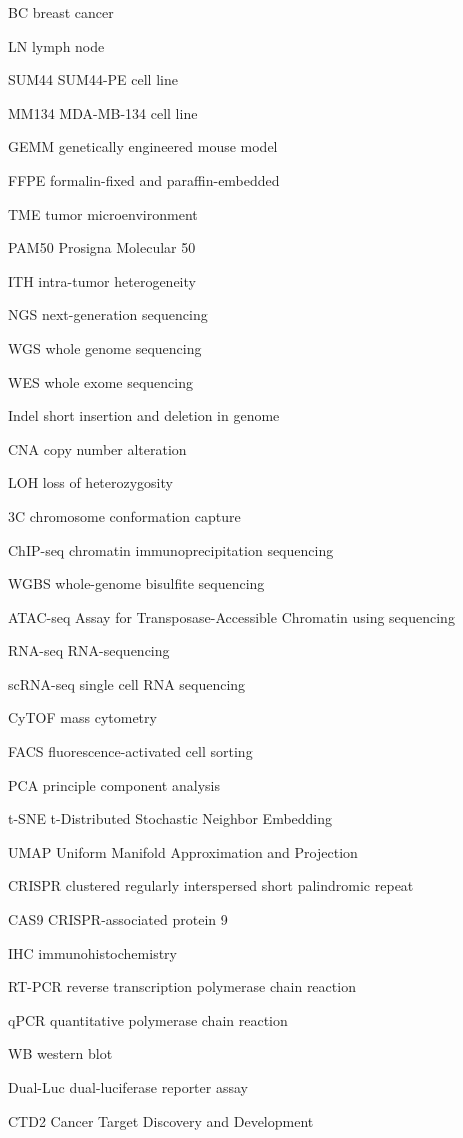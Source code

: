 
\begin{denotation}[3cm]
  \item[BC]	breast cancer 
  \item[LN]	lymph node
  \item[SUM44]	SUM44-PE cell line
  \item[MM134]	MDA-MB-134 cell line
  \item[GEMM]	genetically engineered mouse model
  \item[FFPE]	formalin-fixed and paraffin-embedded
  \item[TME]	tumor microenvironment
  \item[PAM50]	Prosigna Molecular 50
  \item[ITH]	intra-tumor heterogeneity
  \item[NGS]	next-generation sequencing
  \item[WGS]	whole genome sequencing
  \item[WES]	whole exome sequencing
  \item[Indel]	short insertion and deletion in genome
  \item[CNA]	copy number alteration
  \item[LOH]	loss of heterozygosity
  \item[3C]	chromosome conformation capture
  \item[ChIP-seq]	chromatin immunoprecipitation sequencing
  \item[WGBS]	whole-genome bisulfite sequencing
  \item[ATAC-seq]	Assay for Transposase-Accessible Chromatin using sequencing
  \item[RNA-seq]	RNA-sequencing
  \item[scRNA-seq]	single cell RNA sequencing
  \item[CyTOF]	mass cytometry
  \item[FACS]	fluorescence-activated cell sorting 
  \item[PCA]	principle component analysis
  \item[t-SNE]	t-Distributed Stochastic Neighbor Embedding
  \item[UMAP]	Uniform Manifold Approximation and Projection
  \item[CRISPR]	clustered regularly interspersed short palindromic repeat
  \item[CAS9]	CRISPR-associated protein 9
  \item[IHC]	immunohistochemistry
  \item[RT-PCR]	reverse transcription polymerase chain reaction
  \item[qPCR]	quantitative polymerase chain reaction
  \item[WB]	western blot
  \item[Dual-Luc]	dual-luciferase reporter assay
  \item[CTD2]	Cancer Target Discovery and Development
\end{denotation}




